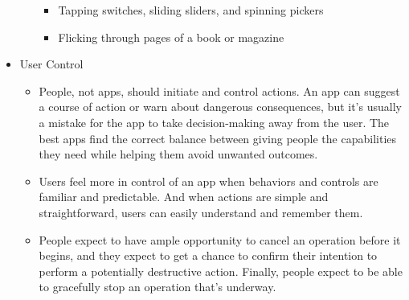 \begin{itemize}
\begin{itemize}
\begin{itemize}
		\item Tapping switches, sliding sliders, and spinning pickers
		\item Flicking through pages of a book or magazine
		\end{itemize}
	\end{itemize}
\newpage
\item User Control
	\begin{itemize}
	\item People, not apps, should initiate and control actions. An app can suggest a course of action or warn about dangerous consequences, but it’s usually a mistake for the app to take decision-making away from the user. The best apps find the correct balance between giving people the capabilities they need while helping them avoid unwanted outcomes.
	\item Users feel more in control of an app when behaviors and controls are familiar and predictable. And when actions are simple and straightforward, users can easily understand and remember them. 
	\item People expect to have ample opportunity to cancel an operation before it begins, and they expect to get a chance to confirm their intention to perform a potentially destructive action. Finally, people expect to be able to gracefully stop an operation that’s underway. 
	\end{itemize}
\end{itemize}
